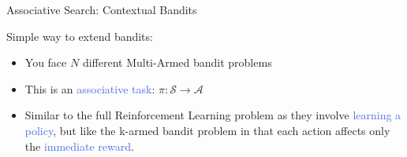 \documentclass{beamer}
\begin{document}
\begin{frame}{Associative Search: Contextual Bandits}

Simple way to extend bandits:

\vspace{2mm}

\begin{itemize}
    \item You face $N$ different Multi-Armed bandit problems%
    \item This is an \textcolor{RoyalBlue}{associative task}: $\pi: \mathcal{S}\rightarrow \mathcal{A}$
    \item Similar to the full Reinforcement Learning problem as they involve \textcolor{RoyalBlue}{learning a policy}, but like the k-armed bandit problem in that each action affects only the \textcolor{RoyalBlue}{immediate reward}.
\end{itemize}

\end{frame}




\end{document}
